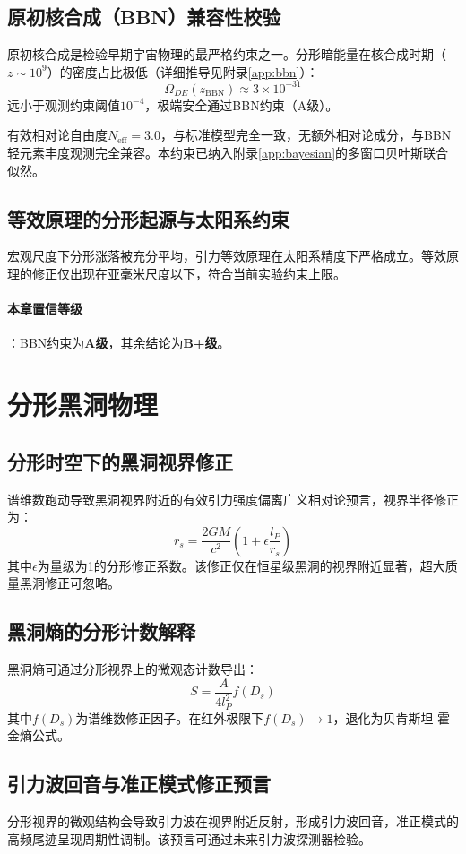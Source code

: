 \documentclass[12pt,a4paper,twocolumn]{article}
\begin{document}
\subsection{原初核合成（BBN）兼容性校验}
原初核合成是检验早期宇宙物理的最严格约束之一。分形暗能量在核合成时期（$z\sim10^9$）的密度占比极低（详细推导见附录\ref{app:bbn}）：
\[
\Omega_{DE}(z_{\text{BBN}}) \approx 3\times 10^{-31}
\]
远小于观测约束阈值$10^{-4}$，极端安全通过BBN约束（A级）。

有效相对论自由度$N_{\text{eff}} = 3.0$，与标准模型完全一致，无额外相对论成分，与BBN轻元素丰度观测完全兼容。本约束已纳入附录\ref{app:bayesian}的多窗口贝叶斯联合似然。

\subsection{等效原理的分形起源与太阳系约束}
宏观尺度下分形涨落被充分平均，引力等效原理在太阳系精度下严格成立。等效原理的修正仅出现在亚毫米尺度以下，符合当前实验约束上限。

\paragraph{本章置信等级}：BBN约束为\textbf{A级}，其余结论为\textbf{B+级}。

\section{分形黑洞物理}

\subsection{分形时空下的黑洞视界修正}
谱维数跑动导致黑洞视界附近的有效引力强度偏离广义相对论预言，视界半径修正为：
\[
r_s = \frac{2GM}{c^2} \left( 1 + \epsilon \frac{l_P}{r_s} \right)
\]
其中$\epsilon$为量级为1的分形修正系数。该修正仅在恒星级黑洞的视界附近显著，超大质量黑洞修正可忽略。

\subsection{黑洞熵的分形计数解释}
黑洞熵可通过分形视界上的微观态计数导出：
\[
S = \frac{A}{4l_P^2} f(D_s)
\]
其中$f(D_s)$为谱维数修正因子。在红外极限下$f(D_s)\to 1$，退化为贝肯斯坦-霍金熵公式。

\subsection{引力波回音与准正模式修正预言}
分形视界的微观结构会导致引力波在视界附近反射，形成引力波回音，准正模式的高频尾迹呈现周期性调制。该预言可通过未来引力波探测器检验。
\end{document}
